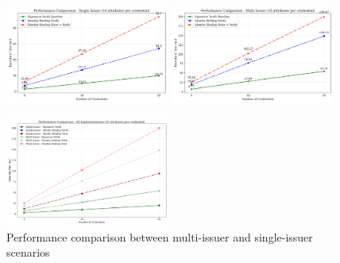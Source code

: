 \begin{figure}
    \centering
    \begin{minipage}{\textwidth}
        \centering
        \includegraphics[width=0.48\textwidth]{figures/identity_binding_single_issuer_performance.png}
        \hfill
        \includegraphics[width=0.48\textwidth]{figures/identity_binding_multi_issuer_performance.png}
    \end{minipage}
    
    \vspace{1em} %
    
    \begin{minipage}{\textwidth}
        \centering
        \includegraphics[width=0.48\textwidth]{figures/identity_binding_combined_performance.png}
    \end{minipage}
    
    \caption{Performance comparison between multi-issuer and single-issuer scenarios}
    \label{fig:performance-comparison}
\end{figure}